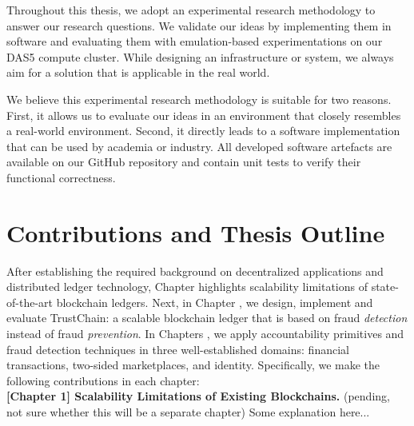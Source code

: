 Throughout this thesis, we adopt an experimental research methodology to answer our research questions.
We validate our ideas by implementing them in software and evaluating them with emulation-based experimentations on our DAS5 compute cluster.
While designing an infrastructure or system, we always aim for a solution that is applicable in the real world.

We believe this experimental research methodology is suitable for two reasons.
First, it allows us to evaluate our ideas in an environment that closely resembles a real-world environment.
Second, it directly leads to a software implementation that can be used by academia or industry.
All developed software artefacts are available on our GitHub repository and contain unit tests to verify their functional correctness.



\section{Contributions and Thesis Outline}

After establishing the required background on decentralized applications and distributed ledger technology, Chapter  highlights scalability limitations of state-of-the-art blockchain ledgers.
Next, in Chapter , we design, implement and evaluate TrustChain: a scalable blockchain ledger that is based on fraud \emph{detection} instead of fraud \emph{prevention}.
In Chapters , we apply accountability primitives and fraud detection techniques in three well-established domains: financial transactions, two-sided marketplaces, and identity.
Specifically, we make the following contributions in each chapter:\\

\textbf{[Chapter 1] Scalability Limitations of Existing Blockchains.} (pending, not sure whether this will be a separate chapter)
Some explanation here...\\

